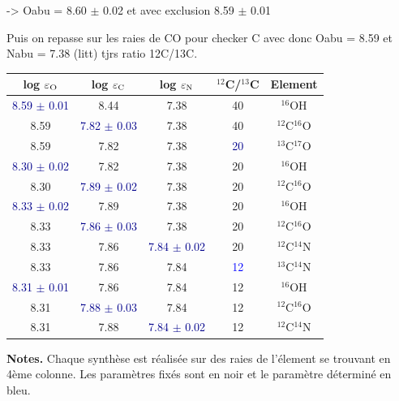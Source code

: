 \documentclass{article}
\begin{document}

-> Oabu = 8.60 $\pm$ 0.02 et avec exclusion 8.59 $\pm$ 0.01

Puis on repasse sur les raies de CO pour checker C avec donc Oabu = 8.59 et Nabu = 7.38 (litt)
tjrs ratio 12C/13C. 

\begin{table}[h!]
  \vspace{0.3cm}
\begin{center}
	\begin{tabular}{ccccc}
        \hline
		\hline
        log $\varepsilon_{\rm O}$ & log $\varepsilon_{\rm C}$ & log $\varepsilon_{\rm N}$ & $^{12}$C/$^{13}$C & Element\\
        \hline
    \textcolor{darkblue}{8.59 $\pm$ 0.01} & 8.44 & 7.38 & 40 & $^{16}$OH \\
    8.59 & \textcolor{darkblue}{7.82 $\pm$ 0.03} & 7.38 & 40 & $^{12}$C$^{16}$O \\
    8.59 & 7.82 & 7.38 & \textcolor{darkblue}{20} & $^{13}$C$^{17}$O \\
    \textcolor{darkblue}{8.30 $\pm$ 0.02} & 7.82 & 7.38 & 20 & $^{16}$OH \\
    8.30 & \textcolor{darkblue}{7.89 $\pm$ 0.02} & 7.38 & 20 & $^{12}$C$^{16}$O \\
    \textcolor{darkblue}{8.33 $\pm$ 0.02} & 7.89 & 7.38 & 20 & $^{16}$OH \\
    8.33 & \textcolor{darkblue}{7.86 $\pm$ 0.03} & 7.38 & 20 & $^{12}$C$^{16}$O \\
    8.33 & 7.86 & \textcolor{darkblue}{7.84 $\pm$ 0.02} & 20 & $^{12}$C$^{14}$N \\
    8.33 & 7.86 & 7.84 & \textcolor{blue}{12} & $^{13}$C$^{14}$N \\
    \textcolor{darkblue}{8.31 $\pm$ 0.01} & 7.86 & 7.84 & 12 & $^{16}$OH \\
    8.31 & \textcolor{darkblue}{7.88 $\pm$ 0.03} & 7.84 & 12 & $^{12}$C$^{16}$O \\
    8.31 & 7.88 & \textcolor{darkblue}{7.84 $\pm$ 0.02} & 12 & $^{12}$C$^{14}$N \\
    \end{tabular}
\end{center} 
\textbf{Notes.} 
Chaque synthèse est réalisée sur des raies de l'élement se trouvant en 4ème colonne. 
Les paramètres fixés sont en noir et le paramètre déterminé en bleu. 
\label{itération_CNO}
\end{table}
\end{document}
